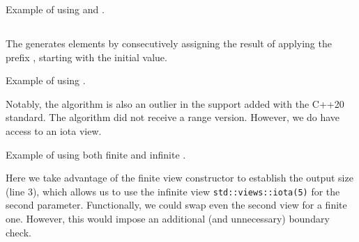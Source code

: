 
\begin{codebox}[]{\href{https://compiler-explorer.com/z/qGcdezEaG}{\ExternalLink}}
\footnotesize Example of using  and .
\tcblower
{}
\end{codebox}

\subsection{\texorpdfstring{}{\texttt{std::iota}}}

The  generates elements by consecutively assigning the result of applying the prefix , starting with the initial value.


\begin{codebox}[]{\href{https://compiler-explorer.com/z/19WaoodvM}{\ExternalLink}}
\footnotesize Example of using .
\tcblower
{}
\end{codebox}

Notably, the  algorithm is also an outlier in the support added with the C++20 standard. The  algorithm did not receive a range version. However, we do have access to an iota view.

\begin{codebox}[]{\href{https://compiler-explorer.com/z/qnz9hWxh8}{\ExternalLink}}
\footnotesize Example of using both finite and infinite .
\tcblower
{}
\end{codebox}

Here we take advantage of the finite view constructor  to establish the output size (line 3), which allows us to use the infinite view \texttt{std::views\-::iota(5)} for the second parameter. Functionally, we could swap even the second view for a finite one. However, this would impose an additional (and unnecessary) boundary check.
